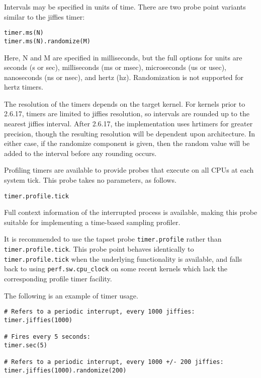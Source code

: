 \documentclass[twoside,english]{article}
\newenvironment{vindent}
{\begin{list}{}{\setlength{\listparindent}{6pt}}
\item[]}
{\end{list}}
\begin{document}
Intervals may be specified in units of time. There are two probe point variants
similar to the jiffies timer:

\begin{vindent}
\begin{verbatim}
timer.ms(N)
timer.ms(N).randomize(M)
\end{verbatim}
\end{vindent}
Here, N and M are specified in milliseconds, but the
full options for units are seconds (s or sec), milliseconds (ms or msec),
microseconds (us or usec), nanoseconds (ns or nsec), and hertz (hz). Randomization
is not supported for hertz timers.

The resolution of the timers depends on the target kernel. For kernels prior
to 2.6.17, timers are limited to jiffies resolution, so intervals are rounded
up to the nearest jiffies interval. After 2.6.17, the implementation uses
hrtimers for greater precision, though the resulting resolution will be dependent
upon architecture. In either case, if the randomize component is given, then
the random value will be added to the interval before any rounding occurs.

Profiling timers are available to provide probes that execute on all CPUs
at each system tick. This probe takes no parameters, as follows.

\begin{vindent}
\begin{verbatim}
timer.profile.tick
\end{verbatim}
\end{vindent}
Full context information of the interrupted process is available, making
this probe suitable for implementing a time-based sampling profiler.

It is recommended to use the tapset probe \verb+timer.profile+ rather
than \verb+timer.profile.tick+. This probe point behaves identically
to \verb+timer.profile.tick+ when the underlying functionality is
available, and falls back to using \verb+perf.sw.cpu_clock+ on some
recent kernels which lack the corresponding profile timer facility.

The following is an example of timer usage.

\begin{vindent}
\begin{verbatim}
# Refers to a periodic interrupt, every 1000 jiffies:
timer.jiffies(1000)

# Fires every 5 seconds:
timer.sec(5)

# Refers to a periodic interrupt, every 1000 +/- 200 jiffies:
timer.jiffies(1000).randomize(200)
\end{verbatim}
\end{vindent}
\end{document}
